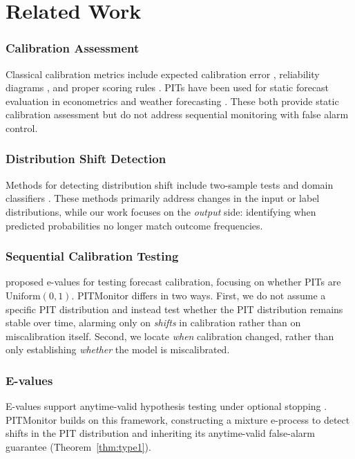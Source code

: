 \documentclass[ejsv2, noshowframe]{imsart}
\theoremstyle{plain}
\theoremstyle{definition}
\theoremstyle{remark}
\newcommand{\Unif}{\mathrm{Uniform}}
\begin{document}
\section{Related Work}

\subsubsection*{Calibration Assessment}
Classical calibration metrics include expected calibration error \citep{guo2017calibration}, reliability diagrams \citep{degroot1983comparison}, and proper scoring rules \citep{gneiting2007strictly}. PITs have been used for static forecast evaluation in econometrics \citep{diebold1998evaluating} and weather forecasting \citep{gneiting2014probabilistic}. These both provide static calibration assessment but do not address sequential monitoring with false alarm control.

\subsubsection*{Distribution Shift Detection}
Methods for detecting distribution shift include two-sample tests \citep{rabanser2019failing} and domain classifiers \citep{lipton2018detecting}. These methods primarily address changes in the input or label distributions, while our work focuses on the \emph{output} side: identifying when predicted probabilities no longer match outcome frequencies.

\subsubsection*{Sequential Calibration Testing}
\citet{arnold2023sequentially} proposed e-values for testing forecast calibration, focusing on whether PITs are $\Unif(0,1)$. PITMonitor differs in two ways. First, we do not assume a specific PIT distribution and instead test whether the PIT distribution remains stable over time, alarming only on \emph{shifts} in calibration rather than on miscalibration itself. Second, we locate \emph{when} calibration changed, rather than only establishing \emph{whether} the model is miscalibrated.

\subsubsection*{E-values}
E-values support anytime-valid hypothesis testing under optional stopping \citep{vovk2021values, ramdas2023game, grunwald2024safe, shin2022detectors}. PITMonitor builds on this framework, constructing a mixture e-process to detect shifts in the PIT distribution and inheriting its anytime-valid false-alarm guarantee (Theorem~\ref{thm:type1}).
\end{document}
